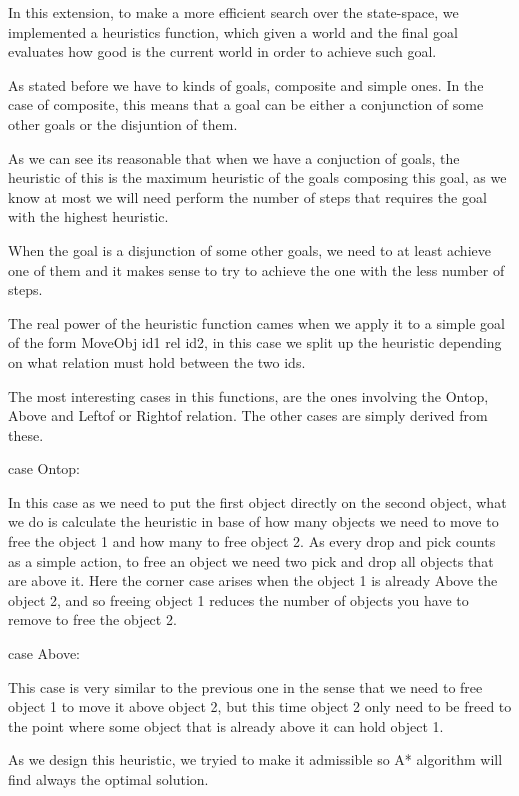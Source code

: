In this extension, to make a more efficient search over the state-space, we implemented
a heuristics function, which given a world and the final goal evaluates how good is the
current world in order to achieve such goal.

As stated before we have to kinds of goals, composite and simple ones. In the case of
composite, this means that a goal can be either a conjunction of some other goals or 
the disjuntion of them.

As we can see its reasonable that when we have a conjuction of goals, the heuristic of this
is the maximum heuristic of the goals composing this goal, as we know at most we will need
perform the number of steps that requires the goal with the highest heuristic.

When the goal is a disjunction of some other goals, we need to at least achieve one of them and it makes sense to try to achieve the one with the less number of steps.

The real power of the heuristic function cames when we apply it to a simple goal of the form
MoveObj id1 rel id2, in this case we split up the heuristic depending on what relation 
must hold between the two ids.
  
The most interesting cases in this functions, are the ones involving the Ontop, Above and Leftof or Rightof relation. The other cases are simply derived from these.

case Ontop:

In this case as we need to put the first object directly on the second object, what we do is
calculate the heuristic in base of how many objects we need to move to free the object 1
and how many to free object 2. As every drop and pick counts as a simple action, to free an object we need two pick and drop all objects that are above it. Here the corner case arises when the object 1 is already Above the object 2, and so freeing object 1 reduces the number of objects you have to remove to free the object 2.

case Above:

This case is very similar to the previous one in the sense that we need to free object 1 to 
move it above object 2, but this time object 2 only need to be freed to the point where 
some object that is already above it can hold object 1.

As we design this heuristic, we tryied to make it admissible so A* algorithm will find always
the optimal solution.
